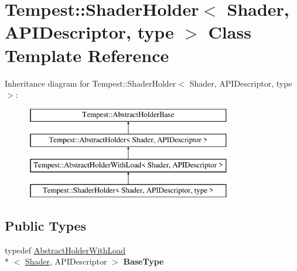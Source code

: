 \hypertarget{class_tempest_1_1_shader_holder}{\section{Tempest\+:\+:Shader\+Holder$<$ Shader, A\+P\+I\+Descriptor, type $>$ Class Template Reference}
\label{class_tempest_1_1_shader_holder}
}
Inheritance diagram for Tempest\+:\+:Shader\+Holder$<$ Shader, A\+P\+I\+Descriptor, type $>$\+:\begin{figure}[H]
\begin{center}
\leavevmode
\includegraphics[height=4.000000cm]{class_tempest_1_1_shader_holder}
\end{center}
\end{figure}
\subsection*{Public Types}
\begin{DoxyCompactItemize}
\item 
\hypertarget{class_tempest_1_1_shader_holder_a82f833d8cf1175088f00d3cac516d2e1}{typedef \hyperlink{class_tempest_1_1_abstract_holder_with_load}{Abstract\+Holder\+With\+Load}\\*
$<$ \hyperlink{class_tempest_1_1_shader}{Shader}, A\+P\+I\+Descriptor $>$ {\bfseries Base\+Type}}\label{class_tempest_1_1_shader_holder_a82f833d8cf1175088f00d3cac516d2e1}

\end{DoxyCompactItemize}
